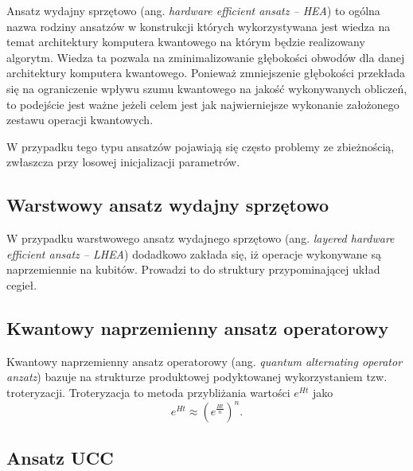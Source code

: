 \documentclass[a4paper,11pt]{article}
\newcommand{\ang}[1]{(ang. \emph{#1})}
\begin{document}
Ansatz wydajny sprzętowo \ang{hardware efficient ansatz -- HEA} to ogólna nazwa rodziny ansatzów w konstrukcji których wykorzystywana jest wiedza na temat architektury komputera kwantowego na którym będzie realizowany algorytm. Wiedza ta pozwala na zminimalizowanie głębokości obwodów dla danej architektury komputera kwantowego. Ponieważ zmniejszenie głębokości przekłada się na ograniczenie wpływu szumu kwantowego na jakość wykonywanych obliczeń, to podejście jest ważne jeżeli celem jest jak najwierniejsze wykonanie założonego zestawu operacji kwantowych.

W przypadku tego typu ansatzów pojawiają się często problemy ze zbieżnością, zwłaszcza przy losowej inicjalizacji parametrów.

\subsection{Warstwowy ansatz wydajny sprzętowo}

W przypadku warstwowego ansatz wydajnego sprzętowo \ang{layered hardware efficient ansatz -- LHEA} dodadkowo zakłada się, iż operacje wykonywane są naprzemiennie na kubitów. Prowadzi to do struktury przypominającej układ cegieł.  

\subsection{Kwantowy naprzemienny ansatz operatorowy}

Kwantowy naprzemienny ansatz operatorowy \ang{quantum alternating operator anzatz} bazuje na strukturze produktowej podyktowanej wykorzystaniem tzw. troteryzacji. Troteryzacja to metoda przybliżania wartości $e^{Ht}$ jako
\begin{equation}
	e^{Ht} \approx \left(e^{\frac{Ht}{n}}\right)^n.
\end{equation}


\subsection{Ansatz UCC}
\end{document}
